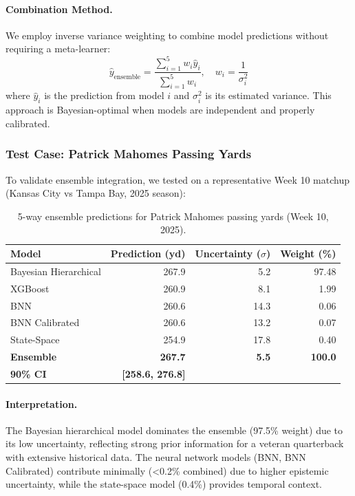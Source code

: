 \paragraph{Combination Method.}
We employ inverse variance weighting to combine model predictions without requiring a meta-learner:
\begin{equation}
\hat{y}_{\text{ensemble}} = \frac{\sum_{i=1}^{5} w_i \hat{y}_i}{\sum_{i=1}^{5} w_i}, \quad w_i = \frac{1}{\sigma_i^2}
\end{equation}
where $\hat{y}_i$ is the prediction from model $i$ and $\sigma_i^2$ is its estimated variance. This approach is Bayesian-optimal when models are independent and properly calibrated.

\subsubsection{Test Case: Patrick Mahomes Passing Yards}

To validate ensemble integration, we tested on a representative Week 10 matchup (Kansas City vs Tampa Bay, 2025 season):

\begin{table}[htbp]
  \centering
  \small
  \caption{5-way ensemble predictions for Patrick Mahomes passing yards (Week 10, 2025).}
  \label{tab:5way-ensemble-test}
  \begin{tabular}{@{} l r r r @{}}
    \toprule
    \textbf{Model} & \textbf{Prediction (yd)} & \textbf{Uncertainty ($\sigma$)} & \textbf{Weight (\%)} \\
    \midrule
    Bayesian Hierarchical & 267.9 & 5.2 & 97.48 \\
    XGBoost & 260.9 & 8.1 & 1.99 \\
    BNN & 260.6 & 14.3 & 0.06 \\
    BNN Calibrated & 260.6 & 13.2 & 0.07 \\
    State-Space & 254.9 & 17.8 & 0.40 \\
    \midrule
    \textbf{Ensemble} & \textbf{267.7} & \textbf{5.5} & \textbf{100.0} \\
    \textbf{90\% CI} & \textbf{[258.6, 276.8]} & & \\
    \bottomrule
  \end{tabular}
\end{table}

\paragraph{Interpretation.}
The Bayesian hierarchical model dominates the ensemble (97.5\% weight) due to its low uncertainty, reflecting strong prior information for a veteran quarterback with extensive historical data. The neural network models (BNN, BNN Calibrated) contribute minimally (<0.2\% combined) due to higher epistemic uncertainty, while the state-space model (0.4\%) provides temporal context.

